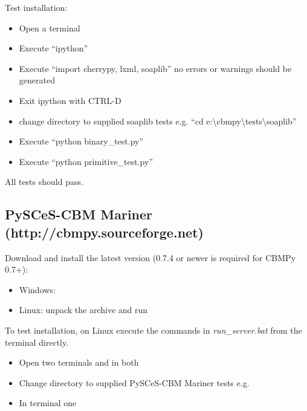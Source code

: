 \documentclass[a4paper,11pt,english]{sphinxmanual}
\begin{document}
Test installation:
\begin{itemize}
\item {} 
Open a terminal

\item {} 
Execute ``ipython''

\item {} 
Execute ``import cherrypy, lxml, soaplib'' no errors or warnings should be generated

\item {} 
Exit ipython with CTRL-D

\item {} 
change directory to supplied soaplib tests e.g. ``cd e:\textbackslash{}cbmpy\textbackslash{}tests\textbackslash{}soaplib''

\item {} 
Execute ``python binary\_test.py''

\item {} 
Execute ``python primitive\_test.py''

\end{itemize}

All tests should pass.


\subsection{PySCeS-CBM Mariner (http://cbmpy.sourceforge.net)}
\label{install_doc:pysces-cbm-mariner-http-cbmpy-sourceforge-net}
Download and install the latest version (0.7.4 or newer is required for CBMPy 0.7+):
\begin{itemize}
\item {} 
Windows: 

\item {} 
Linux: unpack the archive and run 

\end{itemize}

To test installation, on Linux execute the commands in \emph{run\_server.bat} from the terminal directly.
\begin{itemize}
\item {} 
Open two terminals and in both

\item {} 
Change directory to supplied PySCeS-CBM Mariner tests e.g. 

\item {} 
In terminal one 

\end{itemize}
\end{document}
